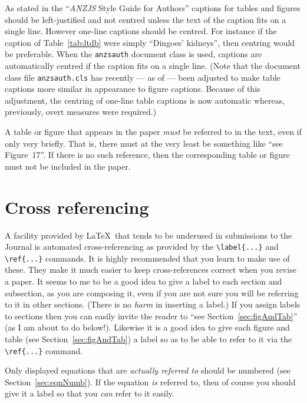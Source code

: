 \documentclass[times, doublespace]{anzsauth}
\begin{document}
As stated in the ``\textit{ANZJS} Style Guide for Authors''
captions for tables and figures should be left-justified and not
centred unless the text of the caption fits on a single line.
However one-line captions should be centred.  For instance if the
caption of Table~\ref{tab:ltdb} were simply ``Dingoes' kidneys'',
then centring would be preferable.  When the \texttt{anzsauth}
document class is used, captions are automatically centred if
the caption fits on a single line.  (Note that the document
class file \texttt{anzsauth.cls} has recently --- as of
 --- been adjusted to make table captions
more similar in appearance to figure captions.  Because of this
adjustment, the centring of one-line table captions is now automatic
whereas, previously, overt measures were required.)

A table or figure that appears in the paper \emph{must} be referred
to in the text, even if only very briefly.  That is, there must
at the very least be something like ``see Figure~17''.  If there
is no such reference, then the corresponding table or figure must
not be included in the paper.

\section{Cross referencing}
\label{sec:crossref}

A facility provided by \LaTeX\ that tends to be underused in
submissions to the Journal is automated cross-referencing as provided
by the \verb!\label{...}! and \verb!\ref{...}! commands.  It is
highly recommended that you learn to make use of these.  They make it
much easier to keep cross-references correct when you revise a paper.
It seems to me to be a good idea to give a label to each section and
subsection, as you are composing it, even if you are not sure you
will be referring to it in other sections.  (There is no \emph{harm}
in inserting a label.)  If you assign labels to sections then you
can easily invite the reader to ``see Section~\ref{sec:figAndTab}''
(as I am about to do below!).  Likewise it is a good idea to give
each figure and table (see Section~\ref{sec:figAndTab}) a label so
as to be able to refer to it via the \verb!\ref{...}!  command.

Only displayed equations that are \emph{actually referred to}
should be numbered (see Section~\ref{sec:eqnNumb}).  If the equation
\emph{is} referred to, then of course you should give it a label so
that you \emph{can} refer to it easily.
\end{document}
